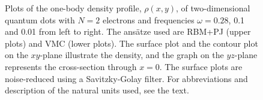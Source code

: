 \begin{figure}
	\hspace{0.1cm}
	\hspace{-0.cm}
	\hspace{-0.cm}
	
	\caption{Plots of the one-body density profile, $\rho(x, y)$, of two-dimensional quantum dots with $N=2$ electrons and frequencies $\omega=0.28$, 0.1 and 0.01 from left to right. The ansätze used are RBM+PJ (upper plots) and VMC (lower plots). The surface plot and the contour plot on the $xy$-plane illustrate the density, and the graph on the $yz$-plane represents the cross-section through $x=0$. The surface plots are noise-reduced using a Savitzky-Golay filter. For  abbreviations and description of the natural units used, see the text.}
	\label{fig:lowfreq2P}
\end{figure}

